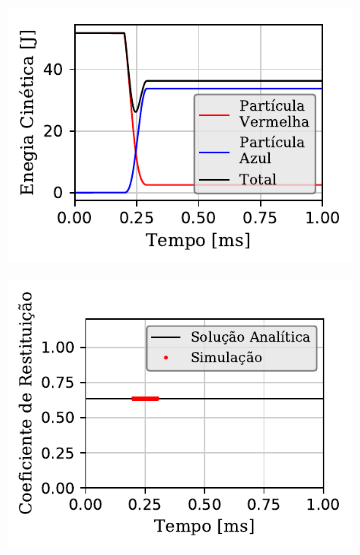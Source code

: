\begin{figure}[H]
{\begin{subfigure}[t]{\smallresultsfigwidth}
			\caption{}
			\label{subfig:colliding_spheres:dissipative_rotation:translational_energy}
		\end{subfigure}
		\begin{subfigure}[t]{\smallresultsfigwidth}
			\centering
			\includegraphics[scale=1]{images/colliding_spheres/dissipative_rotation/kineticEnergy_small_total.pdf}
			\caption{}
			\label{subfig:colliding_spheres:dissipative_rotation:kinetic_energy}
		\end{subfigure}
		\begin{subfigure}[t]{\smallresultsfigwidth}
			\centering
			\includegraphics[scale=1]{images/colliding_spheres/dissipative_rotation/coefficient_of_restitution_small.pdf}
			\caption{}
			\label{subfig:colliding_spheres:dissipative_rotation:coefficient_of_restitution}
		\end{subfigure}
	}
	\label{fig:colliding_spheres:dissipative_rotation:energy_and_coefficient_of_restitution_results}
	\sourceMe
\end{figure}

